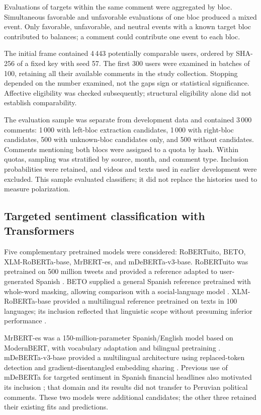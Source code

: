 \documentclass[conference,letterpaper]{IEEEtran}
\begin{document}
Evaluations of targets within the same comment were aggregated by bloc. Simultaneous favorable and unfavorable evaluations of one bloc produced a mixed event. Only favorable, unfavorable, and neutral events with a known target bloc contributed to balances; a comment could contribute one event to each bloc.

The initial frame contained 4\,443 potentially comparable users, ordered by SHA-256 of a fixed key with seed 57. The first 300 users were examined in batches of 100, retaining all their available comments in the study collection. Stopping depended on the number examined, not the gap\textquotesingle s sign or statistical significance. Affective eligibility was checked subsequently; structural eligibility alone did not establish comparability.

The evaluation sample was separate from development data and contained 3\,000 comments: 1\,000 with left-bloc extraction candidates, 1\,000 with right-bloc candidates, 500 with unknown-bloc candidates only, and 500 without candidates. Comments mentioning both blocs were assigned to a quota by hash. Within quotas, sampling was stratified by source, month, and comment type. Inclusion probabilities were retained, and videos and texts used in earlier development were excluded. This sample evaluated classifiers; it did not replace the histories used to measure polarization.

\subsection{Targeted sentiment classification with Transformers}

Five complementary pretrained models were considered: RoBERTuito, BETO, XLM-RoBERTa-base, MrBERT-es, and mDeBERTa-v3-base. RoBERTuito was pretrained on 500 million tweets and provided a reference adapted to user-generated Spanish \cite{robertuito}. BETO supplied a general Spanish reference pretrained with whole-word masking, allowing comparison with a social-language model \cite{BETOResource}. XLM-RoBERTa-base provided a multilingual reference pretrained on texts in 100 languages; its inclusion reflected that linguistic scope without presuming inferior performance \cite{XLMR2020}.

MrBERT-es was a 150-million-parameter Spanish/English model based on ModernBERT, with vocabulary adaptation and bilingual pretraining \cite{MrBERT2026,MrBERTesResource}. mDeBERTa-v3-base provided a multilingual architecture using replaced-token detection and gradient-disentangled embedding sharing \cite{DeBERTaV32023,mDeBERTaResource}. Previous use of mDeBERTa for targeted sentiment in Spanish financial headlines also motivated its inclusion \cite{SINAI2023FinancES}; that domain and its results did not transfer to Peruvian political comments. These two models were additional candidates; the other three retained their existing fits and predictions.
\end{document}
